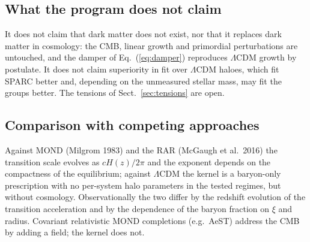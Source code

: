 \documentclass[11pt,a4paper]{article}
\begin{document}
\subsection{What the program does not claim}
It does not claim that dark matter does not exist, nor that it replaces dark matter in cosmology: the CMB, linear growth and primordial perturbations are untouched, and the damper of Eq.~(\ref{eq:damper}) reproduces $\Lambda$CDM growth by postulate. It does not claim superiority in fit over $\Lambda$CDM haloes, which fit SPARC better and, depending on the unmeasured stellar mass, may fit the groups better. The tensions of Sect.~\ref{sec:tensions} are open.

\subsection{Comparison with competing approaches}
Against MOND (Milgrom 1983) and the RAR (McGaugh et al.\ 2016) the transition scale evolves as $cH(z)/2\pi$ and the exponent depends on the compactness of the equilibrium; against $\Lambda$CDM the kernel is a baryon-only prescription with no per-system halo parameters in the tested regimes, but without cosmology. Observationally the two differ by the redshift evolution of the transition acceleration and by the dependence of the baryon fraction on $\xi$ and radius. Covariant relativistic MOND completions (e.g.\ AeST) address the CMB by adding a field; the kernel does not.
\end{document}
